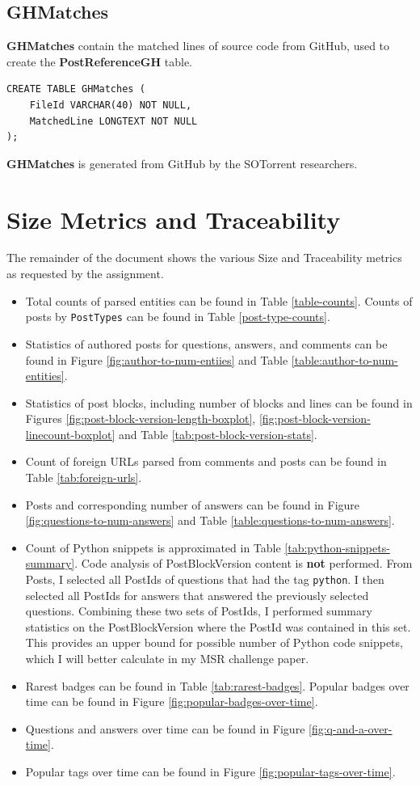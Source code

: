 \documentclass[a4paper,11pt, notitlepage]{report}
\theoremstyle{definition}
\numberwithin{equation}{section}		%
\begin{document}
\subsection{GHMatches}
\textbf{GHMatches} contain the matched lines of source code from GitHub, used to create the \textbf{PostReferenceGH} table.
\begin{lstlisting}
CREATE TABLE GHMatches (
    FileId VARCHAR(40) NOT NULL,
    MatchedLine LONGTEXT NOT NULL
);
\end{lstlisting}
\textbf{GHMatches} is generated from GitHub by the SOTorrent researchers.

\section{Size Metrics and Traceability}

The remainder of the document shows the various Size and Traceability metrics as requested by the assignment.

\begin{itemize}
    \item Total counts of parsed entities can be found in Table \ref{table-counts}. Counts of posts by \texttt{PostTypes} can be found in Table \ref{post-type-counts}.
    \item Statistics of authored posts for questions, answers, and comments can be found in Figure \ref{fig:author-to-num-entiies} and Table \ref{table:author-to-num-entities}.
    \item Statistics of post blocks, including number of blocks and lines can be found in Figures \ref{fig:post-block-version-length-boxplot}, \ref{fig:post-block-version-linecount-boxplot} and Table \ref{tab:post-block-version-stats}.
    \item Count of foreign URLs parsed from comments and posts can be found in Table \ref{tab:foreign-urls}.
    \item Posts and corresponding number of answers can be found in Figure \ref{fig:questions-to-num-answers} and Table \ref{table:questions-to-num-answers}.
    \item Count of Python snippets is approximated in Table \ref{tab:python-snippets-summary}. Code analysis of PostBlockVersion content is \textbf{not} performed. From Posts, I selected all PostIds of questions that had the tag \texttt{python}. I then selected all PostIds for answers that answered the previously selected questions. Combining these two sets of PostIds, I performed summary statistics on the PostBlockVersion where the PostId was contained in this set. This provides an upper bound for possible number of Python code snippets, which I will better calculate in my MSR challenge paper.
    \item Rarest badges can be found in Table \ref{tab:rarest-badges}. Popular badges over time can be found in Figure \ref{fig:popular-badges-over-time}.
    \item Questions and answers over time can be found in Figure \ref{fig:q-and-a-over-time}.
    \item Popular tags over time can be found in Figure \ref{fig:popular-tags-over-time}.
\end{itemize}
\end{document}
